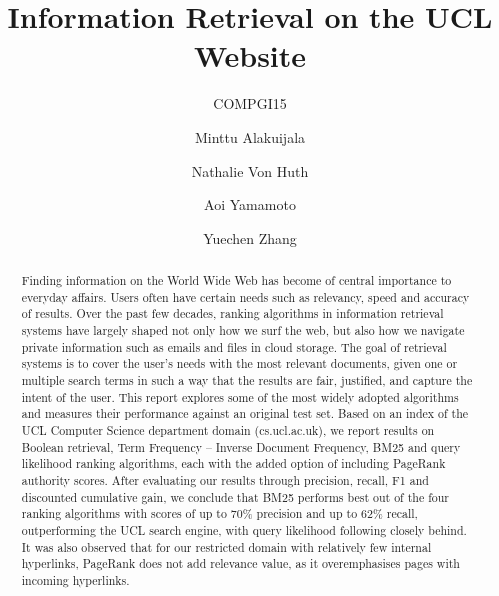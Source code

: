 \documentclass[sigconf]{acmart}
\begin{document}
\title{Information Retrieval on the UCL Website}
\subtitle{COMPGI15}


\author{Minttu Alakuijala}
\affiliation{\institution{}}

\author{Nathalie Von Huth}
\affiliation{\institution{}}

\author{Aoi Yamamoto}
\affiliation{\institution{}}

\author{Yuechen Zhang}
\affiliation{\institution{}}



\begin{abstract}

Finding information on the World Wide Web has become of central importance to everyday affairs. Users often have certain needs such as relevancy, speed and accuracy of results. Over the past few decades, ranking algorithms in information retrieval systems have largely shaped not only how we surf the web, but also how we navigate private information such as emails and files in cloud storage. The goal of retrieval systems is to cover the user's needs with the most relevant documents, given one or multiple search terms in such a way that the results are fair, justified, and capture the intent of the user. This report explores some of the most widely adopted algorithms and measures their performance against an original test set. Based on an index of the UCL Computer Science department domain (cs.ucl.ac.uk), we report results on Boolean retrieval, Term Frequency -- Inverse Document Frequency, BM25 and query likelihood ranking algorithms, each with the added option of including PageRank authority scores. After evaluating our results through precision, recall, F1 and discounted cumulative gain, we conclude that BM25 performs best out of the four ranking algorithms with scores of up to 70\% precision and up to 62\% recall, outperforming the UCL search engine, with query likelihood following closely behind. It was also observed that for our restricted domain with relatively few internal hyperlinks, PageRank does not add relevance value, as it overemphasises pages with incoming hyperlinks.

\end{abstract}

\maketitle




 
\end{document}
